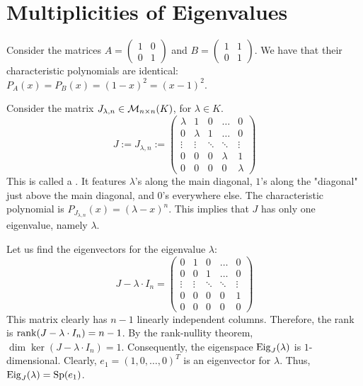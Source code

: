 \section{Multiplicities of Eigenvalues}

\begin{example}\label{ex:char_poly_same}
  Consider the matrices $A = \left(\begin{smallmatrix} 1 & 0 \\ 0 & 1 \end{smallmatrix}\right)$ and $B = \left(\begin{smallmatrix} 1 & 1 \\ 0 & 1 \end{smallmatrix}\right)$.
  We have that their characteristic polynomials are identical: $P_A(x) = P_B(x) = (1-x)^2 = (x-1)^2$.
\end{example}

\begin{example}\label{ex:jordan_block_mult}
  Consider the matrix $J_{\lambda, n} \in \mathcal{M}_{n \times n}(K)$, for $\lambda \in K$.
  \begin{equation} \label{eq:jordan_block}
    J := J_{\lambda,n} := \begin{pmatrix} \lambda & 1 & 0 & \dots & 0 \\ 0 & \lambda & 1 & \dots & 0 \\ \vdots & \vdots & \ddots & \ddots & \vdots \\ 0 & 0 & 0 & \lambda & 1 \\ 0 & 0 & 0 & 0 & \lambda \end{pmatrix}
  \end{equation}
  This is called a . It features $\lambda$'s along the main diagonal, $1$'s along the "diagonal" just above the main diagonal, and $0$'s everywhere else.
  The characteristic polynomial is $P_{J_{\lambda, n}}(x) = (\lambda - x)^n$. This implies that $J$ has only one eigenvalue, namely $\lambda$.

  Let us find the eigenvectors for the eigenvalue $\lambda$:
  \[ J - \lambda \cdot I_n = \begin{pmatrix} 0 & 1 & 0 & \dots & 0 \\ 0 & 0 & 1 & \dots & 0 \\ \vdots & \vdots & \ddots & \ddots & \vdots \\ 0 & 0 & 0 & 0 & 1 \\ 0 & 0 & 0 & 0 & 0 \end{pmatrix} \]
  This matrix clearly has $n-1$ linearly independent columns.
  Therefore, the rank is $\operatorname{rank}(J - \lambda \cdot I_n) = n - 1$.
  By the rank-nullity theorem, $\dim \ker(J - \lambda \cdot I_n) = 1$.
  Consequently, the eigenspace $\operatorname{Eig}_J(\lambda)$ is $1$-dimensional.
  Clearly, $e_1 = (1, 0, \dots, 0)^T$ is an eigenvector for $\lambda$.
  Thus, $\operatorname{Eig}_J(\lambda) = \operatorname{Sp}(e_1)$.
\end{example}

